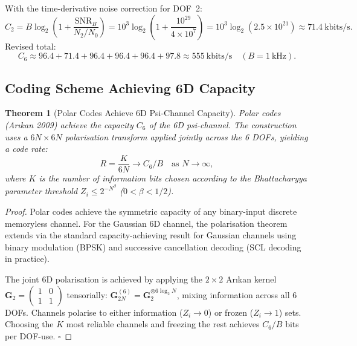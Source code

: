 \documentclass[aps,prd,twocolumn,superscriptaddress,nofootinbib]{revtex4-2}
\newcommand{\SNR}{\mathrm{SNR}}
\newtheorem{theorem}{Theorem}
\begin{document}
With the time-derivative noise correction for DOF~2:
\begin{equation}
C_2 = B\log_2\!\left(1 + \frac{\SNR_B}{N_2/N_0}\right)
= 10^3 \log_2\!\left(1 + \frac{10^{29}}{4\times10^7}\right)
= 10^3 \log_2(2.5\times10^{21}) \approx 71.4~\text{kbits/s}.
\end{equation}
Revised total:
\begin{equation}
\boxed{C_6 \approx 96.4 + 71.4 + 96.4 + 96.4 + 96.4 + 97.8 \approx 555~\text{kbits/s}}
\quad (B = 1~\text{kHz}).
\label{eq:C6-numerical}
\end{equation}

\subsection{Coding Scheme Achieving 6D Capacity}

\begin{theorem}[Polar Codes Achieve 6D Psi-Channel Capacity]
\label{thm:polar}
Polar codes (Ar\i kan 2009) achieve the capacity $C_6$ of the 6D psi-channel.
The construction uses a $6N \times 6N$ polarisation transform applied jointly
across the 6 DOFs, yielding a code rate:
\begin{equation}
R = \frac{K}{6N} \to C_6/B \quad \text{as } N \to \infty,
\label{eq:polar-rate}
\end{equation}
where $K$ is the number of information bits chosen according to the Bhattacharyya
parameter threshold $Z_i \leq 2^{-N^\beta}$ ($0 < \beta < 1/2$).
\end{theorem}

\begin{proof}
Polar codes achieve the symmetric capacity of any binary-input discrete
memoryless channel. For the Gaussian 6D channel, the polarisation theorem
extends via the standard capacity-achieving result for Gaussian channels
using binary modulation (BPSK) and successive cancellation decoding
(SCL decoding in practice).

The joint 6D polarisation is achieved by applying the $2\times 2$ Ar\i kan
kernel $\mathbf{G}_2 = \begin{pmatrix} 1 & 0 \\ 1 & 1\end{pmatrix}$
tensorially: $\mathbf{G}_{2N}^{(6)} = \mathbf{G}_2^{\otimes 6 \log_2 N}$,
mixing information across all 6 DOFs. Channels polarise to either
information ($Z_i \to 0$) or frozen ($Z_i \to 1$) sets.
Choosing the $K$ most reliable channels and freezing the rest
achieves $C_6/B$ bits per DOF-use. $\square$
\end{proof}
\end{document}
